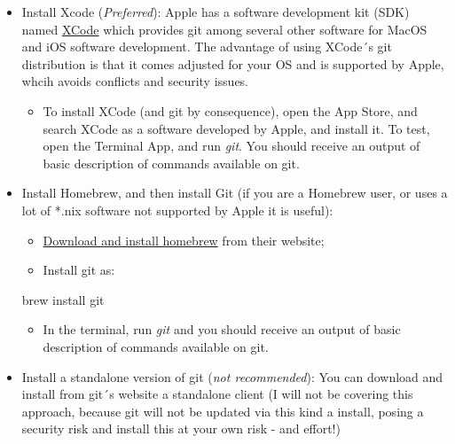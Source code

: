 \documentclass[
]{book}
\newenvironment{Shaded}{\begin{snugshade}}{\end{snugshade}}
\newcommand{\ExtensionTok}[1]{#1}
\newcommand{\NormalTok}[1]{#1}
\providecommand{\tightlist}{%
  \setlength{\itemsep}{0pt}\setlength{\parskip}{0pt}}
\begin{document}
\begin{itemize}
\tightlist
\item
  Install Xcode (\emph{Preferred}): Apple has a software development kit (SDK) named
  \href{https://developer.apple.com/xcode/}{XCode} which provides git among several other
  software for MacOS and iOS software development. The advantage of using XCode´s
  git distribution is that it comes adjusted for your OS and is supported by Apple,
  whcih avoids conflicts and security issues.

  \begin{itemize}
  \tightlist
  \item
    To install XCode (and git by consequence), open the App Store, and search
    XCode as a software developed by Apple, and install it. To test, open the
    Terminal App, and run \emph{git}. You should receive an output of basic
    description of commands available on git.
  \end{itemize}
\item
  Install Homebrew, and then install Git (if you are a Homebrew user, or uses a
  lot of *.nix software not supported by Apple it is useful):

  \begin{itemize}
  \tightlist
  \item
    \href{https://brew.sh/}{Download and install homebrew} from their website;
  \item
    Install git as:
  \end{itemize}

\begin{Shaded}
\begin{Highlighting}[]
\ExtensionTok{brew}\NormalTok{ install git}
\end{Highlighting}
\end{Shaded}

  \begin{itemize}
  \tightlist
  \item
    In the terminal, run \emph{git} and you should receive an output of basic
    description of commands available on git.
  \end{itemize}
\item
  Install a standalone version of git (\emph{not recommended}): You can download and
  install from git´s website a standalone client (I will not be covering this
  approach, because git will not be updated via this kind a install, posing a
  security risk and install this at your own risk - and effort!)
\end{itemize}
\end{document}
